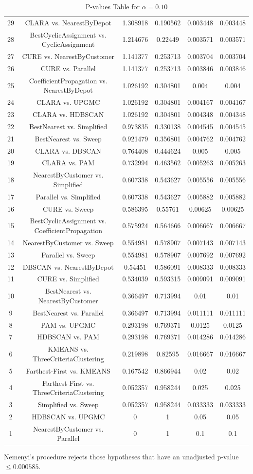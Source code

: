 \documentclass[a4paper,10pt]{article}
\begin{document}
\begin{landscape}
\begin{table}[!htp]
\begin{tabular}{cccccc}
29&CLARA vs. NearestByDepot&1.308918&0.190562&0.003448&0.003448\\
28&BestCyclicAssignment vs. CyclicAssignment&1.214676&0.22449&0.003571&0.003571\\
27&CURE vs. NearestByCustomer&1.141377&0.253713&0.003704&0.003704\\
26&CURE vs. Parallel&1.141377&0.253713&0.003846&0.003846\\
25&CoefficientPropagation vs. NearestByDepot&1.026192&0.304801&0.004&0.004\\
24&CLARA vs. UPGMC&1.026192&0.304801&0.004167&0.004167\\
23&CLARA vs. HDBSCAN&1.026192&0.304801&0.004348&0.004348\\
22&BestNearest vs. Simplified&0.973835&0.330138&0.004545&0.004545\\
21&BestNearest vs. Sweep&0.921479&0.356801&0.004762&0.004762\\
20&CLARA vs. DBSCAN&0.764408&0.444624&0.005&0.005\\
19&CLARA vs. PAM&0.732994&0.463562&0.005263&0.005263\\
18&NearestByCustomer vs. Simplified&0.607338&0.543627&0.005556&0.005556\\
17&Parallel vs. Simplified&0.607338&0.543627&0.005882&0.005882\\
16&CURE vs. Sweep&0.586395&0.55761&0.00625&0.00625\\
15&BestCyclicAssignment vs. CoefficientPropagation&0.575924&0.564666&0.006667&0.006667\\
14&NearestByCustomer vs. Sweep&0.554981&0.578907&0.007143&0.007143\\
13&Parallel vs. Sweep&0.554981&0.578907&0.007692&0.007692\\
12&DBSCAN vs. NearestByDepot&0.54451&0.586091&0.008333&0.008333\\
11&CURE vs. Simplified&0.534039&0.593315&0.009091&0.009091\\
10&BestNearest vs. NearestByCustomer&0.366497&0.713994&0.01&0.01\\
9&BestNearest vs. Parallel&0.366497&0.713994&0.011111&0.011111\\
8&PAM vs. UPGMC&0.293198&0.769371&0.0125&0.0125\\
7&HDBSCAN vs. PAM&0.293198&0.769371&0.014286&0.014286\\
6&KMEANS vs. ThreeCriteriaClustering&0.219898&0.82595&0.016667&0.016667\\
5&Farthest-First vs. KMEANS&0.167542&0.866944&0.02&0.02\\
4&Farthest-First vs. ThreeCriteriaClustering&0.052357&0.958244&0.025&0.025\\
3&Simplified vs. Sweep&0.052357&0.958244&0.033333&0.033333\\
2&HDBSCAN vs. UPGMC&0&1&0.05&0.05\\
1&NearestByCustomer vs. Parallel&0&1&0.1&0.1\\
\hline
\end{tabular}
\caption{P-values Table for $\alpha=0.10$}
\end{table}Nemenyi's procedure rejects those hypotheses that have an unadjusted p-value $\le0.000585$.


\end{landscape}
\end{document}
